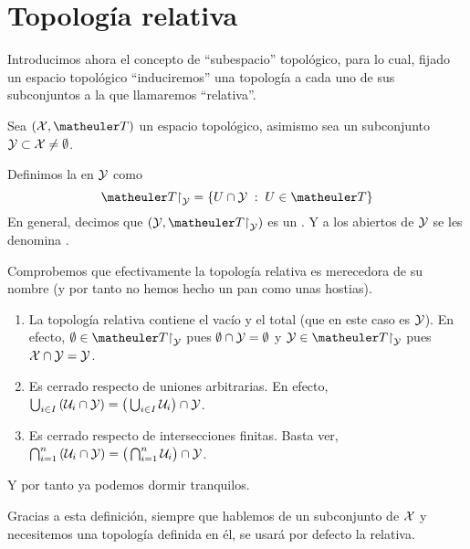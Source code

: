 \section{Topología relativa}
Introducimos ahora el concepto de ``subespacio'' topológico, para lo cual, fijado un espacio topológico ``induciremos'' una topología a cada uno de sus subconjuntos a la que llamaremos ``relativa''.
\begin{defi}
	Sea $(\X,\T)$ un espacio topológico, asimismo sea un subconjunto $\mathcal{Y}\subset\mathcal{X} \neq \emptyset$.
	
	Definimos la  en $\mathcal{Y}$ como \begin{equation}
		\T\restriction_\mc{Y} = \{U\cap\mc{Y}\midc U\in\T\}
	\end{equation}
	En general, decimos que $(\mc{Y},\T\restriction_\mc{Y})$ es un . Y a los abiertos de $\mathcal{Y}$ se les denomina .
\end{defi}
\begin{obs}
	Comprobemos que efectivamente la topología relativa es merecedora de su nombre (y por tanto no hemos hecho un pan como unas hostias).
	\begin{enumerate}
		\item La topología relativa contiene el vacío y el total (que en este caso es $\mathcal{Y}$). En efecto, $\emptyset \in \T\restriction_\mc{Y}$ pues $\emptyset \cap \mathcal{Y} = \emptyset$ y $\mc{Y} \in \T\restriction_\mc{Y}$ pues $\mathcal{X} \cap \mathcal{Y} = \mathcal{Y}$.
		\item Es cerrado respecto de uniones arbitrarias. En efecto, $\bigcup_{i \in I}{(\mathcal{U}_i \cap \mathcal{Y})} = \big( \bigcup_{i \in I} \mathcal{U}_i \big) \cap \mathcal{Y}$.
		\item Es cerrado respecto de intersecciones finitas. Basta ver, $\bigcap_{i = 1}^{n}{(\mathcal{U}_i \cap \mathcal{Y})} = \big( \bigcap_{i=1}^{n} \mathcal{U}_i \big) \cap \mathcal{Y}$.
	\end{enumerate}
	Y por tanto ya podemos dormir tranquilos.
\end{obs}

Gracias a esta definición, siempre que hablemos de un subconjunto de $\mathcal{X}$ y necesitemos una topología definida en él, se usará por defecto la relativa.

